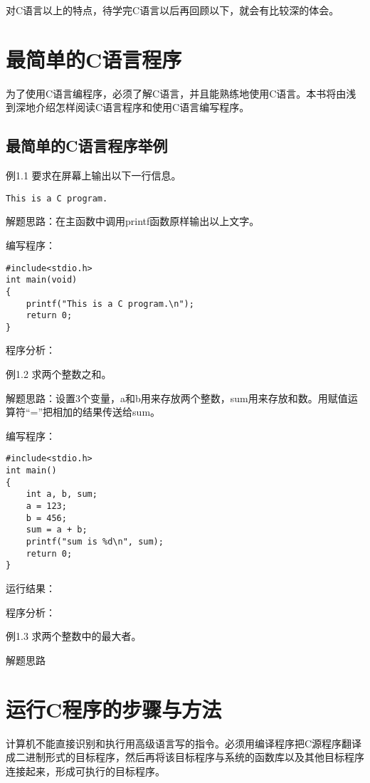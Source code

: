 对C语言以上的特点，待学完C语言以后再回顾以下，就会有比较深的体会。

\section{最简单的C语言程序}

为了使用C语言编程序，必须了解C语言，并且能熟练地使用C语言。本书将由浅到深地介绍怎样阅读C语言程序和使用C语言编写程序。

\subsection{最简单的C语言程序举例}

例1.1 要求在屏幕上输出以下一行信息。
\begin{lstlisting}
This is a C program.
\end{lstlisting}

解题思路：在主函数中调用printf函数原样输出以上文字。

编写程序：
\begin{lstlisting}
#include<stdio.h>
int main(void)
{
	printf("This is a C program.\n");
	return 0;
}
\end{lstlisting}

程序分析：

例1.2 求两个整数之和。

解题思路：设置3个变量，a和b用来存放两个整数，sum用来存放和数。用赋值运算符“=”把相加的结果传送给sum。

编写程序：
\begin{lstlisting}
#include<stdio.h>
int main()
{
	int a, b, sum;
	a = 123;
	b = 456;
	sum = a + b;
	printf("sum is %d\n", sum);
	return 0;
}
\end{lstlisting}
运行结果：

程序分析：

例1.3 求两个整数中的最大者。

解题思路

\section{运行C程序的步骤与方法}

 计算机不能直接识别和执行用高级语言写的指令。必须用编译程序把C源程序翻译成二进制形式的目标程序，然后再将该目标程序与系统的函数库以及其他目标程序连接起来，形成可执行的目标程序。

